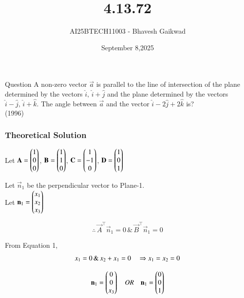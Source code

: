 \documentclass{beamer}
\title
{4.13.72}
\date{September 8,2025}
\author 
{AI25BTECH11003 - Bhavesh Gaikwad}
\begin{document}
\frame{\titlepage}
\begin{frame}{Question}
A non-zero vector $\vec{a}$ is parallel to the line of intersection of the plane determined by the vectors $\hat{i}, \, \hat{i} + \hat{j}$ and the plane determined by the vectors $\hat{i} - \hat{j}, \, \hat{i} + \hat{k}$. The angle between $\vec{a}$ and the vector $\hat{i} - 2\hat{j} + 2\hat{k}$ is?\\
\hfill{(1996)}
\end{frame}

\begin{frame}[fragile]
    \frametitle{Theoretical Solution}
Let $\mathbf{A} =\begin{pmatrix}1 \\ 0 \\ 0\end{pmatrix}$, $\mathbf{B} =\begin{pmatrix} 1 \\ 1 \\ 0\end{pmatrix}$, $\mathbf{C} =\begin{pmatrix}1 \\ -1 \\ 0\end{pmatrix}$, $\mathbf{D} =\begin{pmatrix}1 \\ 0 \\ 1\end{pmatrix}$


Let $\vec{n}_1$ be the perpendicular vector to Plane-1.\\
Let $\mathbf{n}_1 = \begin{pmatrix}x_1 \\ x_2 \\ x_3\end{pmatrix}$

\begin{equation}
\therefore \, \vec{A}^\top\vec{n}_1=0 \, \& \, \vec{B}^\top\vec{n}_1=0
\end{equation}

From Equation 1,
\begin{equation}
x_1 = 0 \, \& \, x_2 + x_1 = 0 \\
\quad \Rightarrow x_1 = x_2 = 0
\end{equation}

\begin{equation}
    \mathbf{n}_1 = \begin{pmatrix}0 \\ 0 \\ x_3\end{pmatrix} \quad OR \quad \mathbf{n}_1 = \begin{pmatrix}0 \\ 0 \\ 1\end{pmatrix}
\end{equation}
\end{frame}
\end{document}
